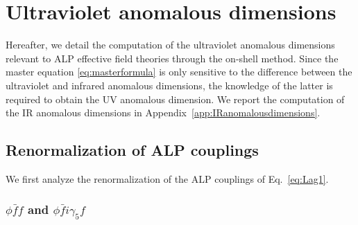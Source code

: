 \section{\label{sec:uvanomalousdim}
Ultraviolet anomalous dimensions}

Hereafter, we detail the computation of the ultraviolet anomalous dimensions relevant to ALP effective field theories through the on-shell method.
Since the master equation \eqref{eq:masterformula}
is only sensitive to the difference between the ultraviolet and infrared anomalous dimensions, the knowledge of the latter is required to obtain the UV anomalous dimension.
We report the computation of the IR anomalous dimensions in Appendix~\ref{app:IRanomalousdimensions}.

\subsection{Renormalization of ALP couplings}

We first analyze the renormalization of the ALP couplings of Eq.~\eqref{eq:Lag1}. 

\subsubsection{$\phi \bar f f$ and $\phi \bar f i \gamma_5 f$}
\label{section_ff}

%
